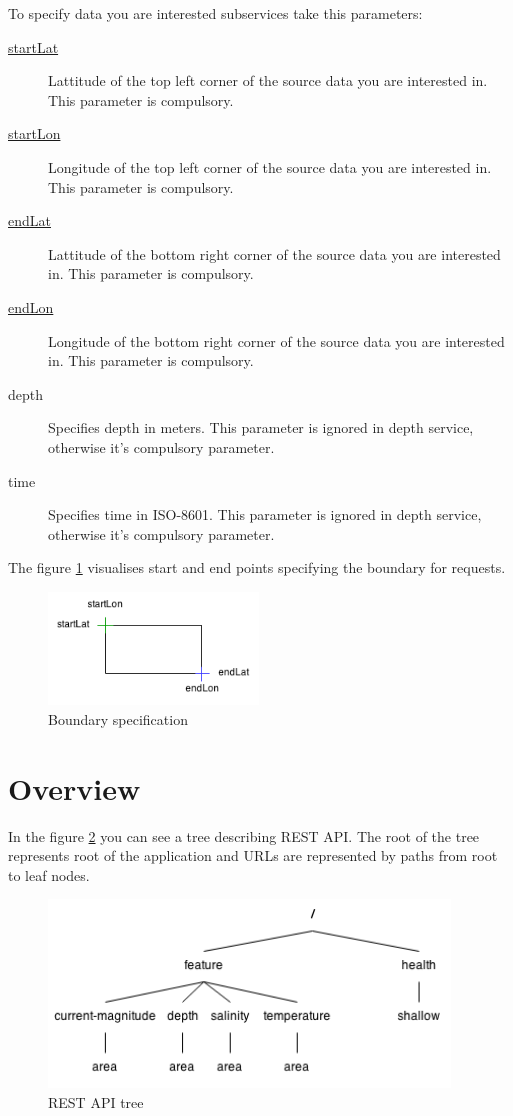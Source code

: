 \documentclass[11pt,a4paper,titlepage,oneside]{report}
\begin{document}
To specify data you are interested subservices take this parameters:
\begin{description}
	\item[\underline{startLat}] Lattitude of the top left corner of the source data you are interested in. This parameter is compulsory.
	\item[\underline{startLon}] Longitude of the top left corner of the source data you are interested in. This parameter is compulsory.
	\item[\underline{endLat}] Lattitude of the bottom right corner of the source data you are interested in. This parameter is compulsory.
	\item[\underline{endLon}] Longitude of the bottom right corner of the source data you are interested in. This parameter is compulsory.
	\item[depth] Specifies depth in meters. This parameter is ignored in depth service, otherwise it's compulsory parameter.
	\item[time] Specifies time in ISO-8601. This parameter is ignored in depth service, otherwise it's compulsory parameter.
\end{description}

The figure \ref{fig:rest_api_boundary} visualises start and end points specifying the boundary for requests.

\begin{figure}[h]
	\centering
	\includegraphics[height=3cm]{img/REST_boundary.png}
	\caption{Boundary specification}
	\label{fig:rest_api_boundary}
\end{figure}

\section{Overview}

In the figure \ref{fig:rest_api_tree} you can see a tree describing REST \gls{API}. The root of the tree represents root of the application and \gls{URL}s are represented by paths from root to leaf nodes.

\begin{figure}[h]
	\centering
	\includegraphics[height=5cm]{img/REST_API.png}
	\caption{REST API tree}
	\label{fig:rest_api_tree}
\end{figure}
\end{document}
